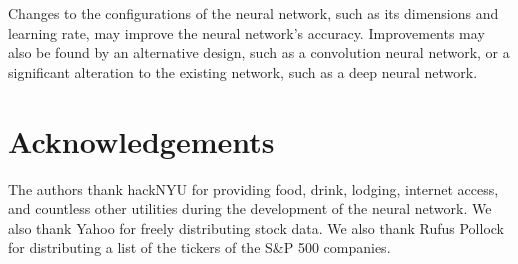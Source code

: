 \documentclass[twocolumn]{article}
\begin{document}
Changes to the configurations of the neural network, such as its dimensions and learning rate, may improve the neural network's accuracy. Improvements may also be found by an alternative design, such as a convolution neural network, or a significant alteration to the existing network, such as a deep neural network.

\section{Acknowledgements}
The authors thank hackNYU for providing food, drink, lodging, internet access, and countless other utilities during the development of the neural network. We also thank Yahoo for freely distributing stock data. We also thank Rufus Pollock for distributing a list of the tickers of the S\&P 500 companies.


\end{document}
